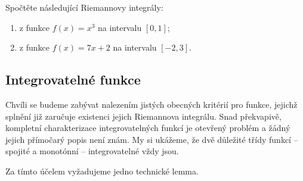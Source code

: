 \begin{exercise}{}{}
 Spočtěte následující Riemannovy integrály:
 \begin{enumerate}
  \item z funkce $f(x) = x^3$ na intervalu $[0,1]$;
  \item z funkce $f(x) = 7x + 2$ na intervalu $[-2,3]$.
 \end{enumerate}
\end{exercise}

\subsection{Integrovatelné funkce}
\label{ssec:integrovatelne-funkce}

Chvíli se budeme zabývat nalezením jistých obecných kritérií pro funkce, jejichž
splnění již zaručuje existenci jejich Riemannova integrálu. Snad překvapivě,
kompletní charakterizace integrovatelných funkcí je otevřený problém a žádný
jejich přímočarý popis není znám. My si ukážeme, že dvě důležité třídy funkcí --
spojité a monotónní -- integrovatelné vždy jsou.

Za tímto účelem vyžadujeme jedno technické lemma.

